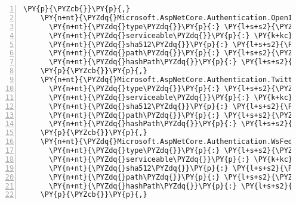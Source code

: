 \begin{Verbatim}[commandchars=\\\{\},numbers=left,firstnumber=1,stepnumber=1,numberblanklines=0]
    \PY{p}{\PYZcb{}}\PY{p}{,}
    \PY{n+nt}{\PYZdq{}Microsoft.AspNetCore.Authentication.OpenIdConnect/2.1.0\PYZhy{}rc1\PYZhy{}final\PYZdq{}}\PY{p}{:} \PY{p}{\PYZob{}}
      \PY{n+nt}{\PYZdq{}type\PYZdq{}}\PY{p}{:} \PY{l+s+s2}{\PYZdq{}package\PYZdq{}}\PY{p}{,}
      \PY{n+nt}{\PYZdq{}serviceable\PYZdq{}}\PY{p}{:} \PY{k+kc}{true}\PY{p}{,}
      \PY{n+nt}{\PYZdq{}sha512\PYZdq{}}\PY{p}{:} \PY{l+s+s2}{\PYZdq{}sha512\PYZhy{}nZzrbNj8NeQl5v0N1yX3/BTHR4BQXyhS6R0vSSqMQs2gk0JF2XEEx4zHtV5lmpBlefYztKDfvJF4GTXgYSvmIQ==\PYZdq{}}\PY{p}{,}
      \PY{n+nt}{\PYZdq{}path\PYZdq{}}\PY{p}{:} \PY{l+s+s2}{\PYZdq{}microsoft.aspnetcore.authentication.openidconnect/2.1.0\PYZhy{}rc1\PYZhy{}final\PYZdq{}}\PY{p}{,}
      \PY{n+nt}{\PYZdq{}hashPath\PYZdq{}}\PY{p}{:} \PY{l+s+s2}{\PYZdq{}microsoft.aspnetcore.authentication.openidconnect.2.1.0\PYZhy{}rc1\PYZhy{}final.nupkg.sha512\PYZdq{}}
    \PY{p}{\PYZcb{}}\PY{p}{,}
    \PY{n+nt}{\PYZdq{}Microsoft.AspNetCore.Authentication.Twitter/2.1.0\PYZhy{}rc1\PYZhy{}final\PYZdq{}}\PY{p}{:} \PY{p}{\PYZob{}}
      \PY{n+nt}{\PYZdq{}type\PYZdq{}}\PY{p}{:} \PY{l+s+s2}{\PYZdq{}package\PYZdq{}}\PY{p}{,}
      \PY{n+nt}{\PYZdq{}serviceable\PYZdq{}}\PY{p}{:} \PY{k+kc}{true}\PY{p}{,}
      \PY{n+nt}{\PYZdq{}sha512\PYZdq{}}\PY{p}{:} \PY{l+s+s2}{\PYZdq{}sha512\PYZhy{}u1J3768OGl4gUDlmHHSnx23M2HGpZQf6JzjmGZAnTnA43oH7hunL/JeOSjF5/yaI0/cDu8alFmy0JsGeF/+Jrw==\PYZdq{}}\PY{p}{,}
      \PY{n+nt}{\PYZdq{}path\PYZdq{}}\PY{p}{:} \PY{l+s+s2}{\PYZdq{}microsoft.aspnetcore.authentication.twitter/2.1.0\PYZhy{}rc1\PYZhy{}final\PYZdq{}}\PY{p}{,}
      \PY{n+nt}{\PYZdq{}hashPath\PYZdq{}}\PY{p}{:} \PY{l+s+s2}{\PYZdq{}microsoft.aspnetcore.authentication.twitter.2.1.0\PYZhy{}rc1\PYZhy{}final.nupkg.sha512\PYZdq{}}
    \PY{p}{\PYZcb{}}\PY{p}{,}
    \PY{n+nt}{\PYZdq{}Microsoft.AspNetCore.Authentication.WsFederation/2.1.0\PYZhy{}rc1\PYZhy{}final\PYZdq{}}\PY{p}{:} \PY{p}{\PYZob{}}
      \PY{n+nt}{\PYZdq{}type\PYZdq{}}\PY{p}{:} \PY{l+s+s2}{\PYZdq{}package\PYZdq{}}\PY{p}{,}
      \PY{n+nt}{\PYZdq{}serviceable\PYZdq{}}\PY{p}{:} \PY{k+kc}{true}\PY{p}{,}
      \PY{n+nt}{\PYZdq{}sha512\PYZdq{}}\PY{p}{:} \PY{l+s+s2}{\PYZdq{}sha512\PYZhy{}Ng/fsCi4SzgYFNFp6++WBOgNVu/wzXNl/2s826yfPwReU3hZIdXB6Ayt8Gtf9ksoss2+bo7frQRG9rQCT7IBJA==\PYZdq{}}\PY{p}{,}
      \PY{n+nt}{\PYZdq{}path\PYZdq{}}\PY{p}{:} \PY{l+s+s2}{\PYZdq{}microsoft.aspnetcore.authentication.wsfederation/2.1.0\PYZhy{}rc1\PYZhy{}final\PYZdq{}}\PY{p}{,}
      \PY{n+nt}{\PYZdq{}hashPath\PYZdq{}}\PY{p}{:} \PY{l+s+s2}{\PYZdq{}microsoft.aspnetcore.authentication.wsfederation.2.1.0\PYZhy{}rc1\PYZhy{}final.nupkg.sha512\PYZdq{}}
    \PY{p}{\PYZcb{}}\PY{p}{,}

\end{Verbatim}
